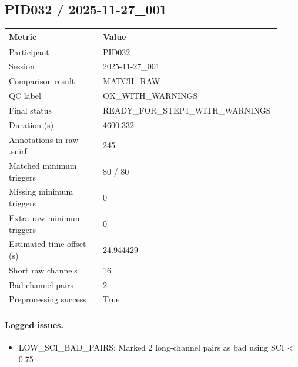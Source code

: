 \subsection*{PID032 / 2025-11-27\_001}
\begin{tabular}{p{0.34\linewidth}p{0.58\linewidth}}
\toprule
Metric & Value\\
\midrule
Participant & PID032\\
Session & 2025-11-27\_001\\
Comparison result & MATCH\_RAW\\
QC label & OK\_WITH\_WARNINGS\\
Final status & READY\_FOR\_STEP4\_WITH\_WARNINGS\\
Duration (s) & 4600.332\\
Annotations in raw .snirf & 245\\
Matched minimum triggers & 80 / 80\\
Missing minimum triggers & 0\\
Extra raw minimum triggers & 0\\
Estimated time offset (s) & 24.944429\\
Short raw channels & 16\\
Bad channel pairs & 2\\
Preprocessing success & True\\
\bottomrule
\end{tabular}
\paragraph{Logged issues.}
\begin{itemize}
\item [WARNING] LOW\_SCI\_BAD\_PAIRS: Marked 2 long-channel pairs as bad using SCI < 0.75
\end{itemize}
